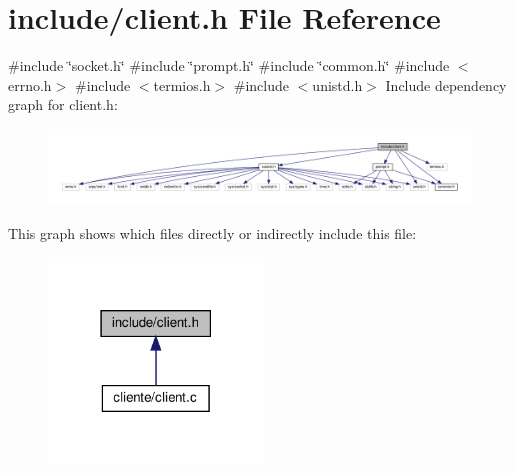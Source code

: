 \section{include/client.h File Reference}
\label{client_8h}
{\ttfamily \#include \char`\"{}socket.\+h\char`\"{}}\newline
{\ttfamily \#include \char`\"{}prompt.\+h\char`\"{}}\newline
{\ttfamily \#include \char`\"{}common.\+h\char`\"{}}\newline
{\ttfamily \#include $<$errno.\+h$>$}\newline
{\ttfamily \#include $<$termios.\+h$>$}\newline
{\ttfamily \#include $<$unistd.\+h$>$}\newline
Include dependency graph for client.\+h\+:\nopagebreak
\begin{figure}[H]
\begin{center}
\leavevmode
\includegraphics[width=350pt]{client_8h__incl}
\end{center}
\end{figure}
This graph shows which files directly or indirectly include this file\+:\nopagebreak
\begin{figure}[H]
\begin{center}
\leavevmode
\includegraphics[width=162pt]{client_8h__dep__incl}
\end{center}
\end{figure}
